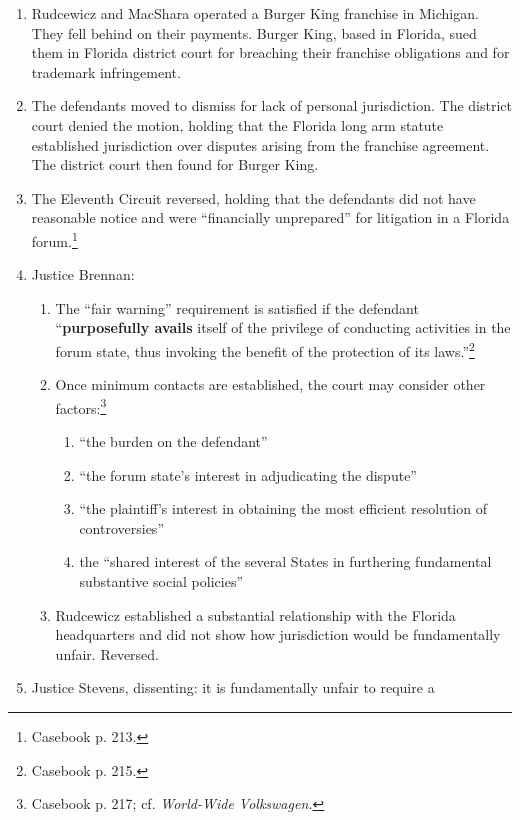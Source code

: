 \begin{enumerate}
    \item Rudcewicz and MacShara operated a Burger King franchise in Michigan. 
    They fell behind on their payments. Burger King, based in Florida, 
    sued them in Florida district court for breaching their franchise 
    obligations and for trademark infringement.
    \item The defendants moved to dismiss for lack of personal jurisdiction. 
    The district court denied the motion, holding that the Florida long arm statute 
    established jurisdiction over disputes arising from the franchise 
    agreement. The district court then found for Burger King.
    \item The Eleventh Circuit reversed, holding that the defendants did not 
    have reasonable notice and were ``financially unprepared'' for litigation 
    in a Florida forum.\footnote{Casebook p. 213.}
    \item Justice Brennan:
    \begin{enumerate}
        \item The ``fair warning'' requirement is satisfied if the defendant 
        ``\textbf{purposefully avails} itself of the privilege of conducting activities 
        in the forum state, thus invoking the benefit of the protection of its 
        laws.''\footnote{Casebook p. 215.}
        \item Once minimum contacts are established, the court may consider 
        other factors:\footnote{Casebook p. 217; cf. \emph{World-Wide 
        Volkswagen.}}
        \begin{enumerate}
            \item ``the burden on the defendant''
            \item ``the forum state's interest in adjudicating the dispute''
            \item ``the plaintiff's interest in obtaining the most efficient 
            resolution of controversies''
            \item the ``shared interest of the several States in furthering 
            fundamental substantive social policies''
        \end{enumerate}
        \item Rudcewicz established a substantial relationship with the 
        Florida headquarters and did not show how jurisdiction would be 
        fundamentally unfair. Reversed.
    \end{enumerate}
    \item Justice Stevens, dissenting: it is fundamentally unfair to require a 

\end{enumerate}
